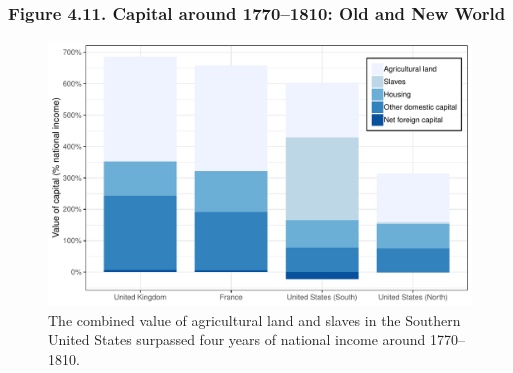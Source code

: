 \documentclass[t]{beamer}\usepackage[]{graphicx}\usepackage[]{color}
\newenvironment{knitrout}{}{} %
\begin{document}
\begin{frame}[label=Figure_4_11]
\frametitle{Figure 4.11. Capital around 1770--1810: Old and New World}
\begin{figure}[t]
\begin{minipage}[b]{\textwidth}
\centering
\begin{knitrout}\footnotesize
{}\color{fgcolor}

{\centering \includegraphics[width=1\linewidth]{figures/color/Figure_4_11} 

}



\end{knitrout}
\caption{The combined value of agricultural land and slaves in the Southern United States surpassed four years of national income around 1770--1810.}
\end{minipage}
\end{figure}
\end{frame}
\end{document}
